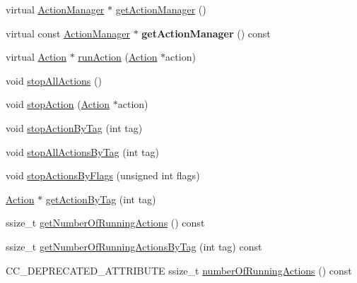 \begin{Indent}
\begin{DoxyCompactItemize}
virtual \hyperlink{classActionManager}{Action\+Manager} $\ast$ \hyperlink{classNode_a4e089841bc08a8753c65b7bb4f96aac5}{get\+Action\+Manager} ()
\item 
\mbox{\label{classNode_a5f453eebf3bf1a7a46ef4369f40ee8f1}} 
virtual const \hyperlink{classActionManager}{Action\+Manager} $\ast$ {\bfseries get\+Action\+Manager} () const
\item 
virtual \hyperlink{classAction}{Action} $\ast$ \hyperlink{classNode_a7af4b13a5b4a595b94d788aaf1961b30}{run\+Action} (\hyperlink{classAction}{Action} $\ast$action)
\item 
void \hyperlink{classNode_a1d542784d864cffe325e9e32d180aa6d}{stop\+All\+Actions} ()
\item 
void \hyperlink{classNode_a7f07a11c8550f7be6b6215b56ab69723}{stop\+Action} (\hyperlink{classAction}{Action} $\ast$action)
\item 
void \hyperlink{classNode_a58833aec8d21bf1ed647865c220c7c49}{stop\+Action\+By\+Tag} (int tag)
\item 
void \hyperlink{classNode_a70f8518979a58094c1ed2dbbe7ebcb9f}{stop\+All\+Actions\+By\+Tag} (int tag)
\item 
void \hyperlink{classNode_a36eef67f2b7d8026328d452e9a5ab09c}{stop\+Actions\+By\+Flags} (unsigned int flags)
\item 
\hyperlink{classAction}{Action} $\ast$ \hyperlink{classNode_aa4ada94036cba5f5e2bcc0437369fc4a}{get\+Action\+By\+Tag} (int tag)
\item 
ssize\+\_\+t \hyperlink{classNode_a576446fef9c35a1a06535eb8949df2f3}{get\+Number\+Of\+Running\+Actions} () const
\item 
ssize\+\_\+t \hyperlink{classNode_a79f360d4398f3748527a281513364d94}{get\+Number\+Of\+Running\+Actions\+By\+Tag} (int tag) const
\item 
C\+C\+\_\+\+D\+E\+P\+R\+E\+C\+A\+T\+E\+D\+\_\+\+A\+T\+T\+R\+I\+B\+U\+TE ssize\+\_\+t \hyperlink{classNode_a7724086be31eda53304e6c9715f6fd21}{number\+Of\+Running\+Actions} () const
\end{DoxyCompactItemize}
\end{Indent}
